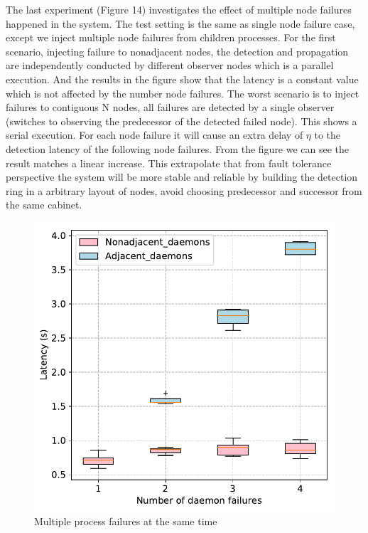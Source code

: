\documentclass[sigconf]{acmart}
\begin{document}
The last experiment (Figure 14) investigates the effect of multiple node failures happened in the system. The test setting is the same as single node failure case, except we inject multiple node failures from children processes. For the first scenario, injecting failure to nonadjacent nodes, the detection and propagation are independently conducted by different observer nodes which is a parallel execution. And the results in the figure show that the latency is a constant value which is not affected by the number node failures. The worst scenario is to inject failures to contiguous N nodes, all failures are detected by a single observer (switches to observing the predecessor of the detected failed node). This shows a serial execution. For each node failure it will cause an extra delay of $ \eta $ to the detection latency of the following node failures. From the figure we can see the result matches a linear increase. This extrapolate that from fault tolerance perspective the system will be more stable and reliable by building the detection ring in a arbitrary layout of nodes, avoid choosing predecessor and successor from the same cabinet.  

\begin{figure}[h]
  \centering
  \includegraphics[width=\linewidth]{multi_daemon_failures.pdf}
  \caption{Multiple process failures at the same time}
\end{figure}
\end{document}
